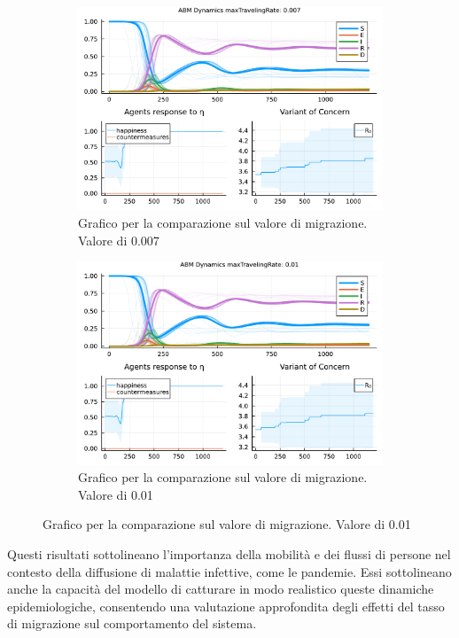 \begin{figure}[!hb]
\begin{subfigure}[b]{0.45\textwidth}
		\includegraphics[width=\textwidth]{img/SocialNetworkABM_3_MTR.pdf}
		\caption{Grafico per la comparazione sul valore di migrazione. Valore di 0.007}
		\label{fig:comparison_maxTravelingRate_midh}
	\end{subfigure}
	\hfill
	\begin{subfigure}[b]{0.45\textwidth}
		\centering
		\includegraphics[width=\textwidth]{img/SocialNetworkABM_4_MTR.pdf}
		\caption{Grafico per la comparazione sul valore di migrazione. Valore di 0.01}
		\label{fig:comparison_maxTravelingRate_high}
	\end{subfigure}
\end{figure}

Questi risultati sottolineano l'importanza della mobilità e dei flussi 
di persone nel contesto della diffusione di malattie infettive, come le 
pandemie. Essi sottolineano anche la capacità del modello di catturare 
in modo realistico queste dinamiche epidemiologiche, consentendo una 
valutazione approfondita degli effetti del tasso di migrazione sul 
comportamento del sistema.
\newpage

